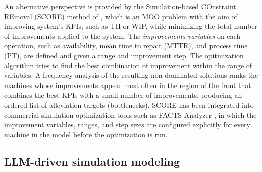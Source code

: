 \documentclass[a4paper,fleqn]{cas-sc}
\begin{document}

  An alternative perspective is provided by the Simulation-based COnstraint REmoval (SCORE) method of \citet{Bernedixen2015}, which is an MOO problem with the aim of improving system's KPIs, such as TH or WIP, while minimizing the total number of improvements applied to the system. The \emph{improvements variables} on each operation, such as availability, mean time to repair (MTTR), and process time (PT), are defined and given a range and improvement step. The opitmization algorithm tries to find the best combination of improvement within the range of variables. A frequency analysis of the resulting non-dominated solutions ranks the machines whose improvements appear most often in the region of the front that combines the best KPIs with a small number of improvements, producing an ordered list of alleviation targets (bottlenecks). SCORE has been integrated into commercial simulation-optimization tools such as FACTS Analyzer \citep{FACTSAnalyzer}, in which the improvement variables, ranges, and step sizes are configured explicitly for every machine in the model before the optimization is run. 
  

\subsection{LLM-driven simulation modeling}\label{sec:related-llm-des}                                                
                                                                                                                 
\end{document}
